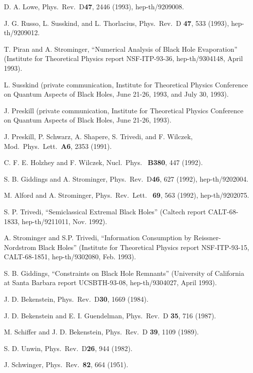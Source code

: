 \documentclass[12pt]{article}
\begin{document}
\begin{thebibliography}{999}
 D. A. Lowe, Phys.\ Rev.\ D{\bf 47}, 2446 (1993),
hep-th/9209008.

 J. G. Russo, L. Susskind, and L. Thorlacius, Phys.\
Rev.\ D{\bf
47}, 533 (1993), hep-th/9209012.

 T. Piran and A. Strominger, ``Numerical Analysis of
Black Hole
Evaporation'' (Institute for Theoretical Physics report
NSF-ITP-93-36,
hep-th/9304148, April 1993).

 L. Susskind (private communication, Institute for
Theoretical
Physics Conference on Quantum Aspects of Black Holes, June 21-26,
1993,
and July 30, 1993).

 J. Preskill (private communication, Institute for
Theoretical
Physics Conference on Quantum Aspects of Black Holes, June 21-26,
1993).

 J. Preskill, P. Schwarz, A. Shapere, S. Trivedi, and
F.
Wilczek,
Mod.\ Phys.\ Lett.\ {\bf A6}, 2353 (1991).

 C. F. E. Holzhey and F. Wilczek, Nucl.\ Phys.\ {\bf
B380}, 447
(1992).

 S. B. Giddings and A. Strominger, Phys.\ Rev.\
D{\bf 46},
627
(1992), hep-th/9202004.

 M. Alford and A. Strominger, Phys.\ Rev.\ Lett.\ {\bf
69}, 563
(1992), hep-th/9202075.

 S. P. Trivedi, ``Semiclassical Extremal Black Holes''
(Caltech report CALT-68-1833, hep-th/9211011, Nov. 1992).

 A. Strominger and S.P. Trivedi, ``Information
Consumption by
Reissner-Nordstrom Black Holes'' (Institute for Theoretical Physics
report
NSF-ITP-93-15, CALT-68-1851, hep-th/9302080, Feb. 1993).

 S. B. Giddings, ``Constraints on Black Hole
Remnants''
(University of California at Santa Barbara report UCSBTH-93-08,
hep-th/9304027,
April 1993).

 J. D. Bekenstein, Phys.\ Rev.\ D{\bf 30}, 1669
(1984).

 J. D. Bekenstein and E. I. Guendelman, Phys.\ Rev.\
D{\bf
35},
716 (1987).

 M. Schiffer and J. D. Bekenstein, Phys.\ Rev.\ D{\bf
39},
1109
(1989).

 S. D. Unwin, Phys.\ Rev.\ D{\bf 26}, 944 (1982).

 J. Schwinger, Phys.\ Rev.\ {\bf 82}, 664 (1951).


\end{thebibliography}
\end{document}
